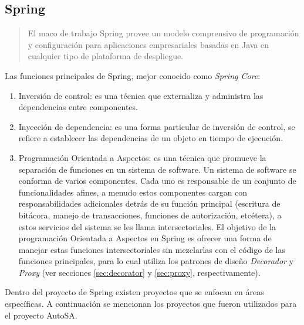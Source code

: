 \subsection{Spring}\label{sec:spring}
\begin{quote}
	El maco de trabajo Spring provee un modelo comprensivo de programación y configuración para aplicaciones empresariales basadas en Java en cualquier tipo de plataforma de despliegue\cite{SpringFramework}.
\end{quote}

Las funciones principales de Spring, mejor conocido como \textit{Spring Core}\cite{Spring5DesignPatterns, ProSpring5, WellGroundedJavaDeveloper, SpringInAction}:
\begin{enumerate}
	\item Inversión de control: es una técnica que externaliza y administra las dependencias entre componentes.

	\item Inyección de dependencia: es una forma particular de inversión de control, se refiere a establecer las dependencias de un objeto en tiempo de ejecución.

	\item Programación Orientada a Aspectos: es una técnica que promueve la separación de funciones en un sistema de software. Un sistema de software se conforma de varios componentes. Cada uno es responsable de un conjunto de funcionalidades afines, a menudo estos componentes cargan con responsabilidades adicionales detrás de su función principal (escritura de bitácora, manejo de transacciones, funciones de autorización, etcétera), a estos servicios del sistema se les llama intersectoriales. El objetivo de la programación Orientada a Aspectos en Spring  es ofrecer una forma de manejar estas funciones intersectoriales sin mezclarlas con el código de las funciones principales, para lo cual utiliza los patrones de diseño \textit{Decorador} y \textit{Proxy} (ver secciones \ref{sec:decorator} y \ref{sec:proxy}, respectivamente).
\end{enumerate}

Dentro del proyecto de Spring existen proyectos que se enfocan en áreas específicas. A continuación se mencionan los proyectos que fueron utilizados para el proyecto AutoSA.

